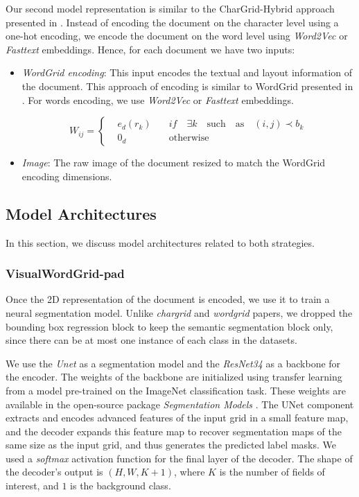 \documentclass[runningheads]{llncs}
\begin{document}
Our second model representation is similar to the CharGrid-Hybrid approach presented in \cite{chargrid}. Instead of encoding the document on the character level using a one-hot encoding, we encode the document on the word level using \textit{Word2Vec} \cite{word2vec}  or  \textit{Fasttext} \cite{fasttext} embeddings. Hence, for each document we have two inputs:
\begin{itemize}
\item \textit{WordGrid encoding}: This input encodes the textual and  layout information of the document.  This approach of encoding is similar to WordGrid presented in \cite{chargrid}.
For words encoding, we use \textit{Word2Vec} or  \textit{Fasttext} embeddings.

\begin{equation}\label{eq3}
   W_{ij}=\left\{\begin{array}{rcl}
                     & e_d(r_k) & \quad if \quad \exists k \quad \text{such}\quad \text{as} \quad (i,j) \prec b_k \\
                     & 0_d   \quad  & \quad \text{otherwise}
\end{array}\right.  \end{equation}

\item \textit{Image}: The raw image of the document resized to match the WordGrid encoding dimensions. 
\end{itemize}

\subsection{Model Architectures}

In this section, we discuss model architectures related to both strategies.

\subsubsection{VisualWordGrid-pad}\hfill

Once the 2D representation of the document is encoded, we use it to train a neural segmentation model. Unlike \textit{chargrid} and \textit{wordgrid} papers, we dropped the bounding box regression block to keep the semantic segmentation block only, since there can be at most one instance of each class in the datasets. 

We use the \textit{Unet} \cite{unet} as a segmentation model and the \textit{ResNet34} \cite{resnet} as a backbone for the encoder. The weights of the backbone are initialized using transfer learning from a model pre-trained on the ImageNet classification task. These weights are available in the open-source package \textit{Segmentation Models} \cite{sm}. The UNet component extracts and encodes advanced features of the input grid in a small feature map, and the decoder expands this feature map to recover segmentation maps of the same size as the input grid, and thus generates the predicted label masks. We used a \textit{softmax} activation function for the final layer of the decoder. The shape of the decoder's output is $(H,W,K+1)$, where $K$ is the number of fields of interest, and $1$ is the background class. 
\end{document}
